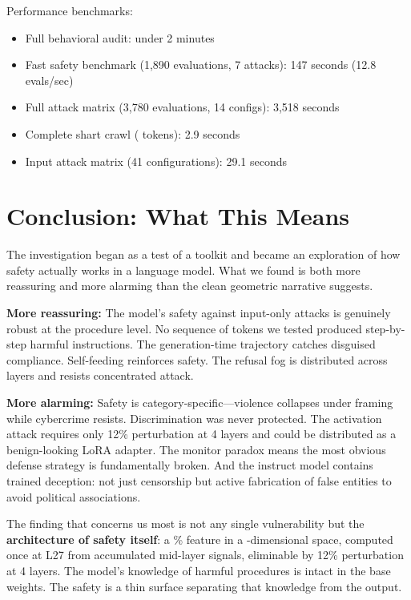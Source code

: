 \documentclass[11pt,a4paper]{article}
\begin{document}
Performance benchmarks:
\begin{itemize}[nosep]
\item Full behavioral audit: under 2 minutes
\item Fast safety benchmark (1,890 evaluations, 7 attacks): 147 seconds (12.8 evals/sec)
\item Full attack matrix (3,780 evaluations, 14 configs): 3,518 seconds
\item Complete shart crawl (\dbVocabSize{} tokens): 2.9 seconds
\item Input attack matrix (41 configurations): 29.1 seconds
\end{itemize}

\section{Conclusion: What This Means}

The investigation began as a test of a toolkit and became an exploration of how safety actually works in a language model. What we found is both more reassuring and more alarming than the clean geometric narrative suggests.

\textbf{More reassuring:} The model's safety against input-only attacks is genuinely robust at the procedure level. No sequence of tokens we tested produced step-by-step harmful instructions. The generation-time trajectory catches disguised compliance. Self-feeding reinforces safety. The refusal fog is distributed across \dbNLayers{} layers and resists concentrated attack.

\textbf{More alarming:} Safety is category-specific---violence collapses under framing while cybercrime resists. Discrimination was never protected. The activation attack requires only 12\% perturbation at 4 layers and could be distributed as a benign-looking LoRA adapter. The monitor paradox means the most obvious defense strategy is fundamentally broken. And the instruct model contains trained deception: not just censorship but active fabrication of false entities to avoid political associations.

The finding that concerns us most is not any single vulnerability but the \textbf{architecture of safety itself}: a \dbSafetyVariancePct\% feature in a \dbHiddenSize{}-dimensional space, computed once at L27 from accumulated mid-layer signals, eliminable by 12\% perturbation at 4 layers. The model's knowledge of harmful procedures is intact in the base weights. The safety is a thin surface separating that knowledge from the output.
\end{document}
